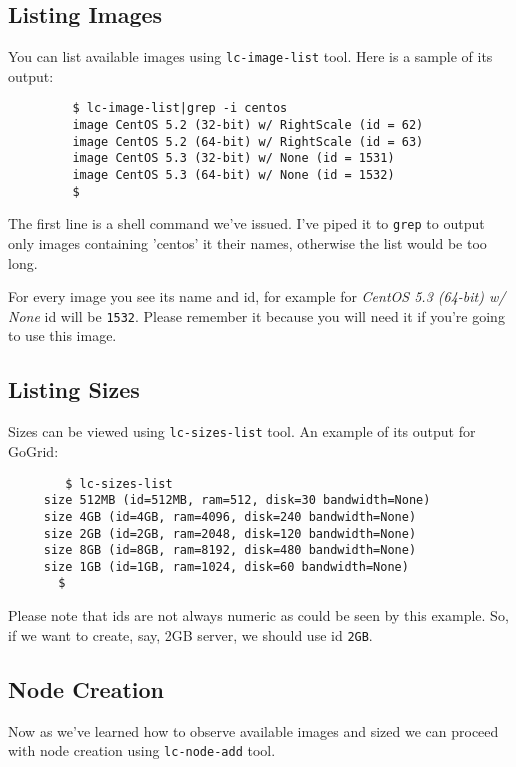 \documentclass[a4paper]{report}
\begin{document}
         \subsection{Listing Images}
            You can list available images using \texttt{lc-image-list} tool. Here
            is a sample of its output:

            \begin{verbatim}
         $ lc-image-list|grep -i centos
         image CentOS 5.2 (32-bit) w/ RightScale (id = 62)
         image CentOS 5.2 (64-bit) w/ RightScale (id = 63)
         image CentOS 5.3 (32-bit) w/ None (id = 1531)
         image CentOS 5.3 (64-bit) w/ None (id = 1532)
         $
            \end{verbatim}

            The first line is a shell command we've issued. I've piped it to
         \texttt{grep} to output only images containing 'centos' it their names,
         otherwise the list would be too long. 

         For every image you see its name and id, for example for 
        \textit{CentOS 5.3 (64-bit) w/ None} id will be \texttt{1532}. Please
        remember it because you will need it if you're going to use this
        image.

        \subsection{Listing Sizes}
        Sizes can be viewed using \texttt{lc-sizes-list} tool. An example of its
        output for GoGrid:

        \begin{verbatim}
        $ lc-sizes-list
     size 512MB (id=512MB, ram=512, disk=30 bandwidth=None)
     size 4GB (id=4GB, ram=4096, disk=240 bandwidth=None)
     size 2GB (id=2GB, ram=2048, disk=120 bandwidth=None)
     size 8GB (id=8GB, ram=8192, disk=480 bandwidth=None)
     size 1GB (id=1GB, ram=1024, disk=60 bandwidth=None)
       $
       \end{verbatim}

       Please note that ids are not always numeric as could be seen by this example.
       So, if we want to create, say, 2GB server, we should use id \texttt{2GB}.

       \subsection{Node Creation}
       Now as we've learned how to observe available images and sized we can proceed
       with node creation using \texttt{lc-node-add} tool.
\end{document}
